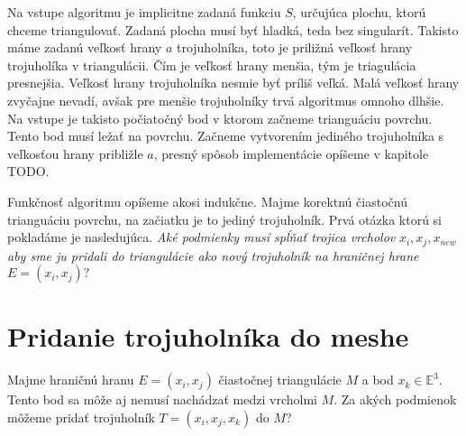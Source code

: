 Na vstupe algoritmu je implicitne zadaná funkciu $S$, určujúca plochu, ktorú chceme triangulovať. 
Zadaná plocha musí byť hladká, teda bez singularít.
Takisto máme zadanú veľkosť hrany $a$ trojuholníka, toto je priližná veľkosť hrany trojuholíka v 
triangulácii. Čím je veľkosť hrany menšia, tým je triagulácia presnejšia. Veľkosť hrany trojuholníka 
nesmie byť príliš veľká. Malá veľkosť hrany zvyčajne nevadí, avšak pre menšie trojuholníky trvá 
algoritmus omnoho dlhšie. Na vstupe je takisto počiatočný bod v ktorom začneme trianguáciu povrchu.
Tento bod musí ležať na povrchu.
Začneme vytvorením jediného trojuholníka s veľkosťou hrany približle $a$, presný spôsob implementácie
opíšeme v kapitole TODO.

Funkčnosť algoritmu opíšeme akosi indukčne. Majme korektnú čiastočnú trianguáciu povrchu, na začiatku
je to jediný trojuholník. Prvá otázka ktorú si pokladáme je nasledujúca. 
\textit{Aké podmienky musí spĺňať trojica vrcholov} $x_i, x_j, x_{new}$ 
\textit{aby sme ju pridali do triangulácie ako nový trojuholník na hraničnej hrane} $E = (x_i, x_j)?$ 

\section{Pridanie trojuholníka do meshe}
\label{kap:triangle_conditions}

Majme hraničnú hranu $E=(x_i, x_j)$ čiastočnej triangulácie $M$ a bod $x_k \in \mathbb{E}^3$. 
Tento bod sa môže aj nemusí nachádzať medzi vrcholmi $M$. Za akých podmienok môžeme pridať trojuholník 
$T=(x_i, x_j, x_k)$ do $M$?

